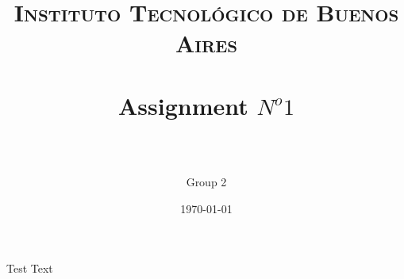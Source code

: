 




\title{
	\normalfont \normalsize \textsc{Instituto Tecnológico de Buenos Aires} \\ [25pt]
	\horrule{2pt} \\[0.4cm]
	\huge Assignment $N^o 1$ \\
	\horrule{2pt} \\[0cm]
\author{Group 2}
}
\date{\today} %

\maketitle
\newpage

\tableofcontents
\newpage
{}

Test Text
